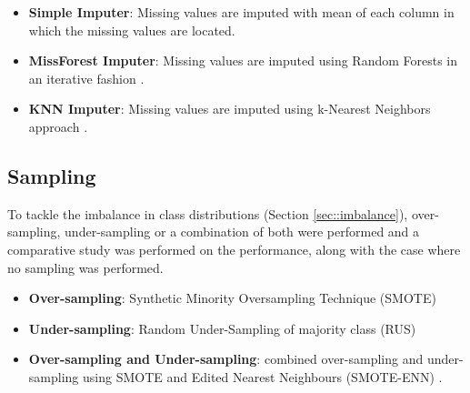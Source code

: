 \documentclass[11pt,a4paper]{article}
\begin{document}
\begin{itemize}
    \item \textbf{Simple Imputer}: Missing values are imputed with mean of each column in which the missing values are located.
    \item \textbf{MissForest Imputer}: Missing values are imputed using Random Forests in an iterative fashion \cite{Stekhoven_2011}.
    \item \textbf{KNN Imputer}: Missing values are imputed using k-Nearest Neighbors approach \cite{mani2003knn}.
\end{itemize}


\subsection{Sampling}
\label{sec::pipe_sampling}
To tackle the imbalance in class distributions (Section \ref{sec::imbalance}), over-sampling, under-sampling or a combination of both were performed and a comparative study was performed on the performance, along with the case where no sampling was performed.


\begin{itemize}
    \item \textbf{Over-sampling}: Synthetic Minority Oversampling Technique (SMOTE) \cite{Chawla_2002}
    \item \textbf{Under-sampling}:  Random Under-Sampling of majority class (RUS)
    \item \textbf{Over-sampling and Under-sampling}: combined over-sampling and under-sampling using SMOTE and Edited Nearest Neighbours (SMOTE-ENN)  \cite{Stekhoven_2011}.
    
\end{itemize}
\end{document}
